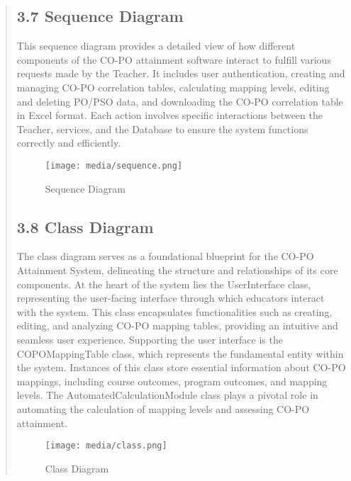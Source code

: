 \documentclass[12pt]{report}
\begin{document}
\begin{quote}
		\subsection{3.7 Sequence Diagram}
		\hspace{1cm}This sequence diagram provides a detailed view of how different components of the CO-PO attainment software interact to fulfill various requests made by the Teacher. It includes user authentication, creating and managing CO-PO correlation tables, calculating mapping levels, editing and deleting PO/PSO data, and downloading the CO-PO correlation table in Excel format. Each action involves specific interactions between the Teacher, services, and the Database to ensure the system functions correctly and efficiently.
		\begin{figure}
			\centering
			\texttt{[image: media/sequence.png]}\\
			\caption{Sequence Diagram}
		\end{figure}
		\clearpage
		
		\subsection{3.8 Class Diagram}
		\hspace{1cm}The class diagram serves as a foundational blueprint for the CO-PO Attainment System, delineating the structure and relationships of its core components. At the heart of the system lies the UserInterface class, representing the user-facing interface through which educators interact with the system. This class encapsulates functionalities such as creating, editing, and analyzing CO-PO mapping tables, providing an intuitive and seamless user experience. Supporting the user interface is the COPOMappingTable class, which represents the fundamental entity within the system. Instances of this class store essential information about CO-PO mappings, including course outcomes, program outcomes, and mapping levels. The AutomatedCalculationModule class plays a pivotal role in automating the calculation of mapping levels and assessing CO-PO attainment. 
		\begin{figure}
			\centering
			\texttt{[image: media/class.png]}\\
			\caption{Class Diagram}
		\end{figure}
		\clearpage
		
		

\end{quote}
\end{document}
